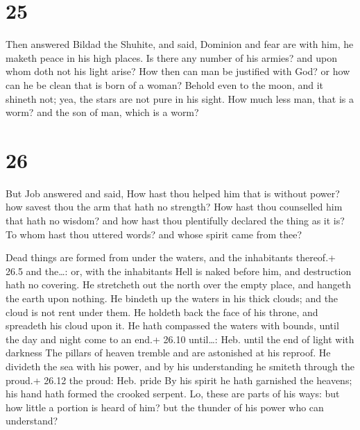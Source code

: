 \hypertarget{section-24}{%
\section{25}\label{section-24}}

 Then answered Bildad the Shuhite, and said, 
Dominion and fear are with him, he maketh peace in his high places.
 Is there any number of his armies? and upon whom doth not
his light arise?  How then can man be justified with God? or
how can he be clean that is born of a woman?  Behold even to
the moon, and it shineth not; yea, the stars are not pure in his sight.
 How much less man, that is a worm? and the son of man,
which is a worm?

\hypertarget{section-25}{%
\section{26}\label{section-25}}

 But Job answered and said,  How hast thou
helped him that is without power? how savest thou the arm that hath no
strength?  How hast thou counselled him that hath no wisdom?
and how hast thou plentifully declared the thing as it is? 
To whom hast thou uttered words? and whose spirit came from thee?

 Dead things are formed from under the waters, and the
inhabitants thereof.+ 26.5 and the\ldots: or, with the inhabitants
 Hell is naked before him, and destruction hath no covering.
 He stretcheth out the north over the empty place, and
hangeth the earth upon nothing.  He bindeth up the waters in
his thick clouds; and the cloud is not rent under them.  He
holdeth back the face of his throne, and spreadeth his cloud upon it.
 He hath compassed the waters with bounds, until the day
and night come to an end.+ 26.10 until\ldots: Heb. until the end of
light with darkness  The pillars of heaven tremble and are
astonished at his reproof.  He divideth the sea with his
power, and by his understanding he smiteth through the proud.+ 26.12 the
proud: Heb. pride  By his spirit he hath garnished the
heavens; his hand hath formed the crooked serpent.  Lo,
these are parts of his ways: but how little a portion is heard of him?
but the thunder of his power who can understand?

